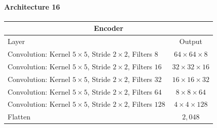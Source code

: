 \paragraph{Architecture 16}

\begin{center}
    \begin{table}[H]
        \centering
        \begin{tabular}{ | l | c | }
            \multicolumn{2}{c}{Encoder} \\ \hline
            Layer & Output\\ \hline
            Convolution: Kernel $5\times5$, Stride $2\times2$, Filters $8  $    & $64\times 64\times 8  $    \\  
            Convolution: Kernel $5\times5$, Stride $2\times2$, Filters $16 $    & $32\times 32\times 16 $    \\
            Convolution: Kernel $5\times5$, Stride $2\times2$, Filters $32 $    & $16\times 16\times 32 $    \\
            Convolution: Kernel $5\times5$, Stride $2\times2$, Filters $64 $    & $8\times 8\times   64 $    \\
            Convolution: Kernel $5\times5$, Stride $2\times2$, Filters $128$    & $4\times 4\times   128$    \\
            Flatten                                                             & $2,048$                    \\
            \hline
        \end{tabular} 
    \end{table}
\end{center}
\vspace{-4em}

